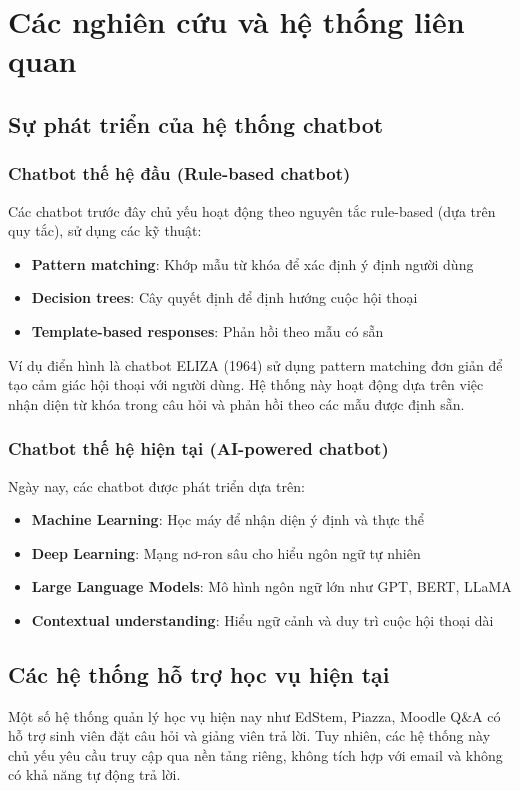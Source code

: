 \documentclass[../DoAn.tex]{subfiles}
\begin{document}
\section{Các nghiên cứu và hệ thống liên quan}

\subsection{Sự phát triển của hệ thống chatbot}

\subsubsection{Chatbot thế hệ đầu (Rule-based chatbot)}
Các chatbot trước đây chủ yếu hoạt động theo nguyên tắc rule-based (dựa trên quy tắc), sử dụng các kỹ thuật:
\begin{itemize}
    \item \textbf{Pattern matching}: Khớp mẫu từ khóa để xác định ý định người dùng
    \item \textbf{Decision trees}: Cây quyết định để định hướng cuộc hội thoại
    \item \textbf{Template-based responses}: Phản hồi theo mẫu có sẵn
\end{itemize}

Ví dụ điển hình là chatbot ELIZA (1964) sử dụng pattern matching đơn giản để tạo cảm giác hội thoại với người dùng. Hệ thống này hoạt động dựa trên việc nhận diện từ khóa trong câu hỏi và phản hồi theo các mẫu được định sẵn.

\subsubsection{Chatbot thế hệ hiện tại (AI-powered chatbot)}
Ngày nay, các chatbot được phát triển dựa trên:
\begin{itemize}
    \item \textbf{Machine Learning}: Học máy để nhận diện ý định và thực thể
    \item \textbf{Deep Learning}: Mạng nơ-ron sâu cho hiểu ngôn ngữ tự nhiên
    \item \textbf{Large Language Models}: Mô hình ngôn ngữ lớn như GPT, BERT, LLaMA
    \item \textbf{Contextual understanding}: Hiểu ngữ cảnh và duy trì cuộc hội thoại dài
\end{itemize}

\subsection{Các hệ thống hỗ trợ học vụ hiện tại}
Một số hệ thống quản lý học vụ hiện nay như EdStem, Piazza, Moodle Q\&A có hỗ trợ sinh viên đặt câu hỏi và giảng viên trả lời. Tuy nhiên, các hệ thống này chủ yếu yêu cầu truy cập qua nền tảng riêng, không tích hợp với email và không có khả năng tự động trả lời.
\end{document}
